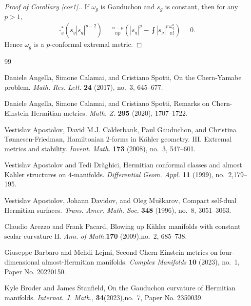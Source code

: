 \documentclass[12pt]{amsart}
\theoremstyle{plain}
\theoremstyle{definition}
\newcommand{\ee}{\end{eqnarray*}}
\newcommand{\be}{\begin{eqnarray*}}
\renewcommand{\>}{\rightarrow}
\renewcommand{\#}{\sharp}
\numberwithin{equation}{section} %
\begin{document}
\baselineskip

    \begin{proof}[Proof of Corollary \ref{cor1}.] If $\omega_g$ is Gauduchon and  $s_g$ is constant, then for any $p>1$,
    \be
    \square_g^*\left(s_g|s_g|^{p-2}\right)=\frac{n-p}{np}\left(|s_g|^p-\intbar|s_g|^p\frac{\omega_g^n}{n!}\right)=0.
    \ee
    Hence $\omega_g$ is a $p$-conformal extremal metric.
    \end{proof}

\baselineskip

\begin{thebibliography}{99}

    Daniele Angella, Simone Calamai, and Cristiano Spotti, On the Chern-Yamabe problem.
    {\em Math. Res. Lett.}
    \textbf{24} (2017), no.~3, 645--677.

    Daniele Angella, Simone Calamai, and Cristiano Spotti,  Remarks on Chern-Einstein Hermitian metrics.
    {\em Math. Z.}
    \textbf{295} (2020), 1707--1722.

    Vestislav Apostolov, David M.J. Calderbank, Paul Gauduchon, and Christina Tønnesen-Friedman,
    Hamiltonian 2-forms in Kähler geometry. III. Extremal metrics and stability.
    \textit{Invent. Math.}
    \textbf{173} (2008), no.~3, 547--601.


    Vestislav Apostolov and Tedi Dr\u{a}ghici,
    Hermitian conformal classes and almost {K}\"{a}hler structures on {$4$}-manifolds.
    {\em Differential Geom. Appl.}
    \textbf{11} (1999), no.~2,179--195.

    Vestislav Apostolov, Johann Davidov, and Oleg Mu\v{s}karov,
    Compact self-dual Hermitian surfaces.
    {\em Trans. Amer. Math. Soc.}
    \textbf{348} (1996), no.~8, 3051--3063.


    Claudio Arezzo and Frank Pacard,
    Blowing up K\"ahler manifolds with constant scalar curvature {II}.
    {\it Ann. of Math.}\textbf{170} (2009),no.~2,  685--738.

    Giuseppe Barbaro and Mehdi  Lejmi,
    Second Chern-Einstein metrics on four-dimensional almost-Hermitian manifolds.
    \emph{Complex Manifolds}
    \textbf{10} (2023), no.~1, Paper No. 20220150.

    Kyle Broder and James Stanfield, On the Gauduchon curvature of Hermitian manifolds.
    {\em Internat. J. Math.},
    \textbf{34}(2023),no.~7, Paper No. 2350039.


\end{thebibliography}
\end{document}
